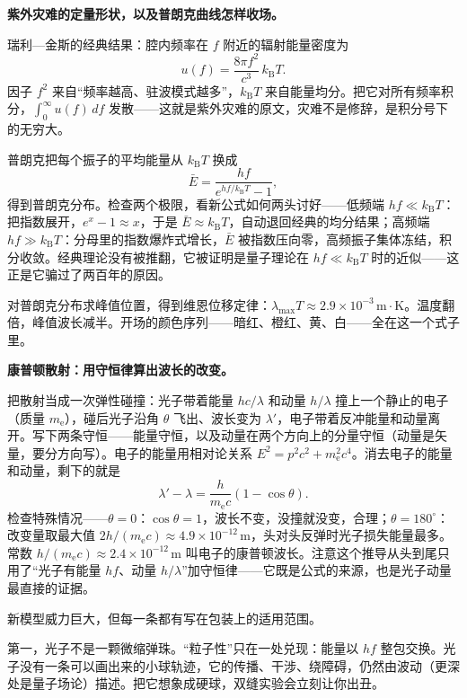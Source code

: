 \begin{mathbridge}
\textbf{紫外灾难的定量形状，以及普朗克曲线怎样收场。}

瑞利—金斯的经典结果：腔内频率在 \(f\) 附近的辐射能量密度为
\[
u(f) = \frac{8\pi f^2}{c^3}\,k_{\mathrm{B}}T.
\]
因子 \(f^2\) 来自“频率越高、驻波模式越多”，\(k_{\mathrm{B}}T\) 来自能量均分。把它对所有频率积分，\(\int_0^\infty u(f)\,df\) 发散——这就是紫外灾难的原文，灾难不是修辞，是积分号下的无穷大。

普朗克把每个振子的平均能量从 \(k_{\mathrm{B}}T\) 换成
\[
\bar{E} = \frac{hf}{e^{hf/k_{\mathrm{B}}T} - 1},
\]
得到普朗克分布。检查两个极限，看新公式如何两头讨好——低频端 \(hf \ll k_{\mathrm{B}}T\)：把指数展开，\(e^{x} - 1 \approx x\)，于是 \(\bar{E} \approx k_{\mathrm{B}}T\)，自动退回经典的均分结果；高频端 \(hf \gg k_{\mathrm{B}}T\)：分母里的指数爆炸式增长，\(\bar{E}\) 被指数压向零，高频振子集体冻结，积分收敛。经典理论没有被推翻，它被证明是量子理论在 \(hf \ll k_{\mathrm{B}}T\) 时的近似——这正是它骗过了两百年的原因。

对普朗克分布求峰值位置，得到维恩位移定律：\(\lambda_{\max} T \approx 2.9\times10^{-3}\,\mathrm{m\cdot K}\)。温度翻倍，峰值波长减半。开场的颜色序列——暗红、橙红、黄、白——全在这一个式子里。
\end{mathbridge}

\begin{challenge}
\textbf{康普顿散射：用守恒律算出波长的改变。}

把散射当成一次弹性碰撞：光子带着能量 \(hc/\lambda\) 和动量 \(h/\lambda\) 撞上一个静止的电子（质量 \(m_{\mathrm{e}}\)），碰后光子沿角 \(\theta\) 飞出、波长变为 \(\lambda'\)，电子带着反冲能量和动量离开。写下两条守恒——能量守恒，以及动量在两个方向上的分量守恒（动量是矢量，要分方向写）。电子的能量用相对论关系 \(E^2 = p^2c^2 + m_{\mathrm{e}}^2c^4\)。消去电子的能量和动量，剩下的就是
\[
\lambda' - \lambda = \frac{h}{m_{\mathrm{e}}c}(1 - \cos\theta).
\]
检查特殊情况——\(\theta = 0\)：\(\cos\theta = 1\)，波长不变，没撞就没变，合理；\(\theta = 180^\circ\)：改变量取最大值 \(2h/(m_{\mathrm{e}}c) \approx 4.9\times10^{-12}\,\mathrm{m}\)，头对头反弹时光子损失能量最多。常数 \(h/(m_{\mathrm{e}}c) \approx 2.4\times10^{-12}\,\mathrm{m}\) 叫电子的康普顿波长。注意这个推导从头到尾只用了“光子有能量 \(hf\)、动量 \(h/\lambda\)”加守恒律——它既是公式的来源，也是光子动量最直接的证据。
\end{challenge}


新模型威力巨大，但每一条都有写在包装上的适用范围。

第一，光子不是一颗微缩弹珠。“粒子性”只在一处兑现：能量以 \(hf\) 整包交换。光子没有一条可以画出来的小球轨迹，它的传播、干涉、绕障碍，仍然由波动（更深处是量子场论）描述。把它想象成硬球，双缝实验会立刻让你出丑。

